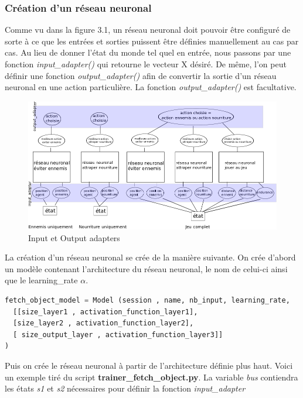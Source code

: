\documentclass[11pt,a4paper]{report}
\begin{document}
 \subsubsection{Création d'un réseau neuronal} 
 
 \par Comme vu dans la figure 3.1, un réseau neuronal doit pouvoir être configuré de sorte à ce que les entrées et sorties puissent être définies manuellement au cas par cas. Au lieu de donner l'état du monde tel quel en entrée, nous passons par une fonction \textit{input\_adapter()} qui retourne le vecteur X désiré. De même, l'on peut définir une fonction \textit{output\_adapter()} afin de convertir la sortie d'un réseau neuronal en une action particulière. La fonction \textit{output\_adapter()} est facultative. 
 
  \begin{figure}[!h]
  \center
  \includegraphics[scale=0.6]{ressources/input_output_adapters.png}
  \caption{Input et Output adapters}
  \end{figure} 

  \par La création d'un réseau neuronal se crée de la manière suivante. On crée d'abord un modèle contenant l'architecture du réseau neuronal, le nom de celui-ci ainsi que le learning\_rate $\alpha$. 
  
 \begin{lstlisting}[language=python]
fetch_object_model = Model (session , name, nb_input, learning_rate,
  [[size_layer1 , activation_function_layer1],
  [size_layer2 , activation_function_layer2],
  [ size_output_layer , activation_function_layer3]]
)
  \end{lstlisting}  
  
  \par Puis on crée le réseau neuronal à partir de l'architecture définie plus haut. Voici un exemple tiré du script \textbf{trainer\_fetch\_object.py}. La variable \textit{bus} contiendra les états \textit{s1} et \textit{s2} nécessaires pour définir la fonction \textit{input\_adapter}
  
\end{document}
